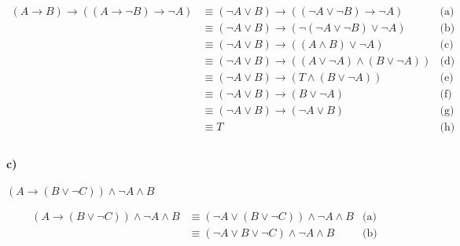 \documentclass[12pt]{article}
\begin{document}
\begin{align*}
    (A \rightarrow B) \rightarrow ((A \rightarrow \neg B) \rightarrow \neg A)  & \equiv (\neg A \vee B) \rightarrow ((\neg A \vee \neg B) \rightarrow \neg A) & \text{(a)} \\
                                                                               & \equiv (\neg A \vee B) \rightarrow (\neg (\neg A \vee \neg B) \vee \neg A)   & \text{(b)} \\
                                                                               & \equiv (\neg A \vee B) \rightarrow ((A \wedge B) \vee \neg A)                & \text{(c)} \\
                                                                               & \equiv (\neg A \vee B) \rightarrow ((A \vee \neg A) \wedge (B \vee \neg A))  & \text{(d)} \\
                                                                               & \equiv (\neg A \vee B) \rightarrow (T \wedge (B \vee \neg A))                & \text{(e)} \\
                                                                               & \equiv (\neg A \vee B) \rightarrow (B \vee \neg A)                           & \text{(f)} \\
                                                                               & \equiv (\neg A \vee B) \rightarrow (\neg A \vee B)                           & \text{(g)} \\
                                                                               & \equiv T                                                                     & \text{(h)} \\
\end{align*}

\paragraph{c)} $ (A \rightarrow (B \vee \neg C)) \wedge \neg A \wedge B $

\begin{align*}
    (A \rightarrow (B \vee \neg C)) \wedge \neg A \wedge B & \equiv (\neg A \vee (B \vee \neg C)) \wedge \neg A \wedge B  & \text{(a)} \\
                                                           & \equiv (\neg A \vee B \vee \neg C) \wedge \neg A \wedge B    & \text{(b)} \\
\end{align*}
\end{document}
